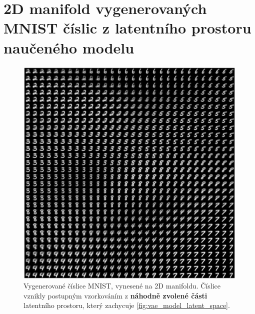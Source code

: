 \chapter{2D manifold vygenerovaných MNIST číslic z latentního prostoru naučeného modelu}
\label{app:reconstruction_manfiold}

\begin{figure}[H]
    \centering
    \includegraphics[width=\textwidth]{figures/2d_manifold.png}
    \caption{Vygenerované číslice MNIST, vynesené na 2D manifoldu. Číslice vznikly postupným vzorkováním z \textbf{náhodně zvolené části} latentního prostoru, který zachycuje \autoref{fig:vae_model_latent_space}.}
\end{figure}
